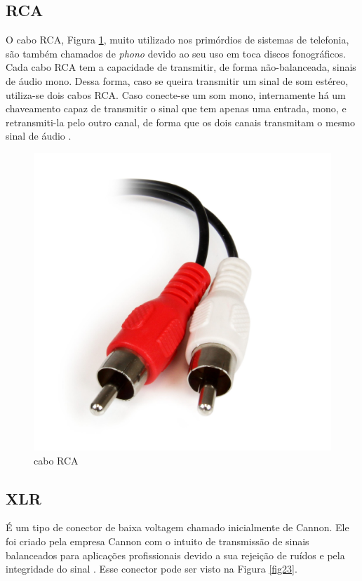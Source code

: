 \subsection{RCA}
 O cabo RCA, Figura \ref{fig22}, muito utilizado nos primórdios de sistemas de telefonia, são também chamados de \textit{phono} devido ao seu uso em toca discos fonográficos. Cada cabo RCA tem a capacidade de transmitir, de forma não-balanceada, sinais de áudio mono. Dessa forma, caso se queira transmitir um sinal de som estéreo, utiliza-se dois cabos RCA. Caso conecte-se um som mono, internamente há um chaveamento capaz de transmitir o sinal que tem apenas uma entrada, mono, e retransmiti-la pelo outro canal, de forma que os dois canais transmitam o mesmo sinal de áudio \cite{bartlett}.

 \begin{figure}[h]
	\centering
    \includegraphics[scale=0.1]{figuras/fig22.png}
	\caption{cabo RCA \cite{rs}}
	\label{fig22}
\end{figure}

\subsection{XLR}
É um tipo de conector de baixa voltagem chamado inicialmente de Cannon. Ele foi criado pela empresa Cannon com o intuito de transmissão de sinais balanceados para aplicações profissionais devido a sua rejeição de ruídos e pela integridade do sinal \cite{bartlett}. Esse conector pode ser visto na Figura \ref{fig23}.

